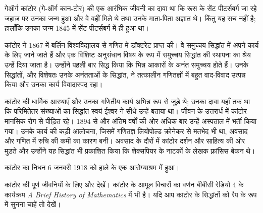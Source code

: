 \documentclass[../../../include/open-logic-section]{subfiles}
\begin{document}



गेऑर्ग कांटोर (\textsc{गे}-ऑर्ग \textsc{कान}-टोर) की एक आरंभिक जीवनी का
दावा था कि रूस के सेंट पीटर्सबर्ग जा रहे जहाज़ पर उनका जन्म हुआ और वे वहीं
मिले थे तथा उनके माता-पिता अज्ञात थे। किंतु यह सच नहीं है; हालाँकि उनका जन्म
1845 में सेंट पीटर्सबर्ग में ही हुआ था।

कांटोर ने 1867 में बर्लिन विश्वविद्यालय से गणित में डॉक्टरेट प्राप्त की। वे
समुच्चय सिद्धांत में अपने कार्य के लिए जाने जाते हैं और एक विशिष्ट अनुसंधान
विषय के रूप में समुच्चय सिद्धांत की स्थापना का श्रेय उन्हें दिया जाता है।
उन्होंने पहली बार सिद्ध किया कि भिन्न आकारों के अनंत समुच्चय होते हैं। उनके
सिद्धांतों, और विशेषतः उनके अनंतताओं के सिद्धांत, ने तत्कालीन गणितज्ञों में
बहुत वाद-विवाद उत्पन्न किया और उनका कार्य विवादास्पद रहा।

कांटोर की धार्मिक आस्थाएँ और उनका गणितीय कार्य अभिन्न रूप से जुड़े थे; उनका
दावा यहाँ तक था कि परिमितेतर संख्याओं का सिद्धांत स्वयं ईश्वर ने सीधे उन्हें
बताया था। जीवन के उत्तरार्ध में कांटोर मानसिक रोग से पीड़ित रहे। 1894 से और
अंतिम वर्षों की ओर अधिक बार उन्हें अस्पताल में भर्ती किया गया। उनके कार्य की
कड़ी आलोचना, जिसमें गणितज्ञ लियोपोल्ड क्रोनेकर से मतभेद भी था, अवसाद और गणित
में रुचि की कमी का कारण बनी। अवसाद के दौरों में कांटोर दर्शन और साहित्य की
ओर मुड़ते और उन्होंने यह सिद्धांत भी प्रकाशित किया कि शेक्सपियर के नाटकों के
लेखक फ़्रांसिस बेकन थे।

कांटोर का निधन 6 जनवरी 1918 को हाले के एक आरोग्याश्रम में हुआ।

\begin{reading} 
कांटोर की पूर्ण जीवनियों के लिए \citet{Dauben1990} और
\citet{Grattan-Guinness1971} देखें। कांटोर के आमूल विचारों का वर्णन बीबीसी
रेडियो 4 के कार्यक्रम \emph{A Brief History of Mathematics}
\citep{Sautoy2014} में भी है। यदि आप कांटोर के सिद्धांतों को रैप के रूप में
सुनना चाहें तो \citet{Rose2012} देखें।
\end{reading}
\end{document}
